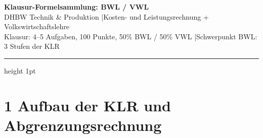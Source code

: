 \documentclass[10pt,a4paper]{article}
\begin{document}
\begin{center}
  {\LARGE\bfseries\color{bwlblue} Klausur-Formelsammlung: BWL / VWL}\\[4pt]
  {\normalsize DHBW Technik \& Produktion \quad|\quad Kosten- und Leistungsrechnung + Volkswirtschaftslehre}\\[2pt]
  {\small\color{gray} Klausur: 4--5 Aufgaben, 100 Punkte, 50\% BWL / 50\% VWL \quad|\quad Schwerpunkt BWL: 3 Stufen der KLR}
\end{center}
{\color{bwlblue}\hrule height 1pt}
\vspace{4pt}

\section{1 \quad Aufbau der KLR und Abgrenzungsrechnung}
\end{document}
